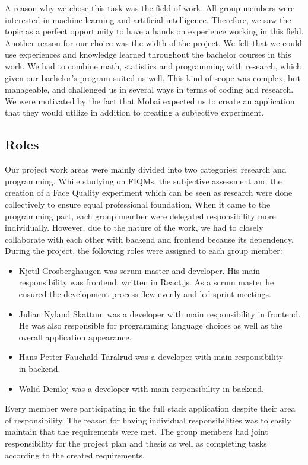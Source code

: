 A reason why we chose this task was the field of work. All group members were interested in machine learning and artificial intelligence. Therefore, we saw the topic as a perfect opportunity to have a hands on experience working in this field. Another reason for our choice was the width of the project. We felt that we could use experiences and knowledge learned throughout the bachelor courses in this work. We had to combine math, statistics and programming with research, which given our bachelor's program suited us well. This kind of scope was complex, but manageable, and challenged us in several ways in terms of coding and research. We were motivated by the fact that Mobai expected us to create an application that they would utilize in addition to creating a subjective experiment.   

\subsection{Roles}
\label{subsec:roles}
Our project work areas were mainly divided into two categories: research and programming. While studying on FIQMs, the subjective assessment and the creation of a Face Quality experiment which can be seen as research were done collectively to ensure equal professional foundation. When it came to the programming part, each group member were delegated responsibility more individually. However, due to the nature of the work, we had to closely collaborate with each other with backend and frontend because its dependency. During the project, the following roles were assigned to each group member:
\begin{itemize}
    \item Kjetil Grosberghaugen was scrum master and developer. His main responsibility was frontend, written in React.js. As a scrum master he ensured the development process flew evenly and led sprint meetings.
    \item Julian Nyland Skattum was a developer with main responsibility in frontend. He was also responsible for programming language choices as well as the overall application appearance. 
    \item Hans Petter Fauchald Taralrud was a developer with main responsibility\\ in backend. 
    \item Walid Demloj was a developer with main responsibility in backend. 
\end{itemize}

Every member were participating in the full stack application despite their area of responsibility. The reason for having individual responsibilities was to easily maintain that the requirements were met. The group members had joint responsibility for the project plan and thesis as well as completing tasks according to the created requirements. 

